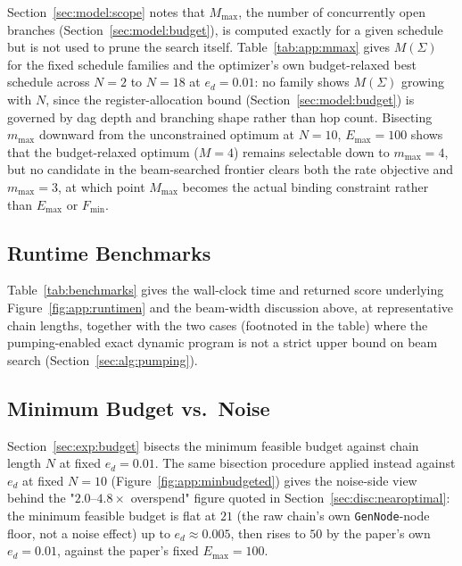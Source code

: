 Section~\ref{sec:model:scope} notes that $M_{\max}$, the number of concurrently open branches (Section~\ref{sec:model:budget}), is computed exactly for a given schedule but is not used to prune the search itself. Table~\ref{tab:app:mmax} gives $M(\Sigma)$ for the fixed schedule families and the optimizer's own budget-relaxed best schedule across $N=2$ to $N=18$ at $e_d=0.01$: no family shows $M(\Sigma)$ growing with $N$, since the register-allocation bound (Section~\ref{sec:model:budget}) is governed by \Gls{dag} depth and branching shape rather than hop count. Bisecting $m_{\max}$ downward from the unconstrained optimum at $N=10$, $E_{\max}=100$ shows that the budget-relaxed optimum ($M=4$) remains selectable down to $m_{\max}=4$, but no candidate in the beam-searched frontier clears both the rate objective and $m_{\max}=3$, at which point $M_{\max}$ becomes the actual binding constraint rather than $E_{\max}$ or $F_{\min}$.



\subsection{Runtime Benchmarks}
\label{app:runtime}

Table~\ref{tab:benchmarks} gives the wall-clock time and returned score underlying Figure~\ref{fig:app:runtimen} and the beam-width discussion above, at representative chain lengths, together with the two cases (footnoted in the table) where the pumping-enabled exact dynamic program is not a strict upper bound on beam search (Section~\ref{sec:alg:pumping}).



\subsection{Minimum Budget vs.\ Noise}
\label{app:minbudgeted}

Section~\ref{sec:exp:budget} bisects the minimum feasible budget against chain length $N$ at fixed $e_d=0.01$. The same bisection procedure applied instead against $e_d$ at fixed $N=10$ (Figure~\ref{fig:app:minbudgeted}) gives the noise-side view behind the "$2.0$--$4.8\times$ overspend" figure quoted in Section~\ref{sec:disc:nearoptimal}: the minimum feasible budget is flat at $21$ (the raw chain's own \texttt{GenNode}-node floor, not a noise effect) up to $e_d\approx0.005$, then rises to $50$ by the paper's own $e_d=0.01$, against the paper's fixed $E_{\max}=100$.

